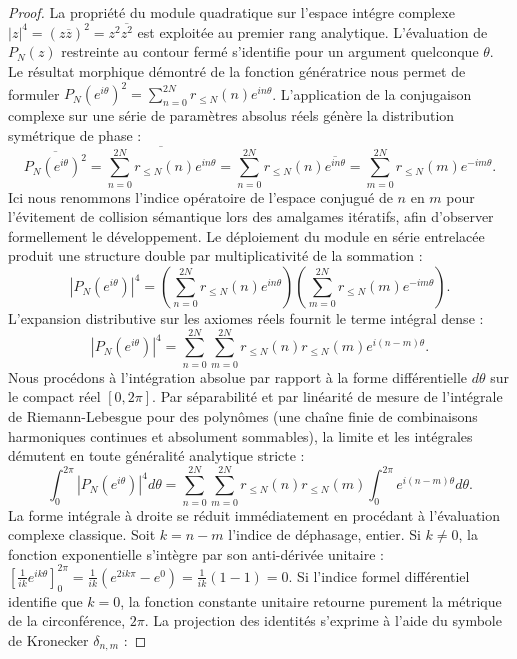 \documentclass[12pt,a4paper]{article}
\begin{document}
\begin{proof}
La propri\'et\'e du module quadratique sur l'espace int\'egre complexe $|z|^4 = (z \overline{z})^2 = z^2 \overline{z^2}$ est exploit\'ee au premier rang analytique. L'\'evaluation de $P_N(z)$ restreinte au contour ferm\'e s'identifie pour un argument quelconque $\theta$. Le r\'esultat morphique d\'emontr\'e de la fonction g\'en\'eratrice nous permet de formuler $P_N(e^{i\theta})^2 = \sum_{n=0}^{2N} r_{\le N}(n) e^{in\theta}$.
L'application de la conjugaison complexe sur une s\'erie de param\`etres absolus r\'eels g\'en\`ere la distribution sym\'etrique de phase :
\begin{equation}
\overline{P_N(e^{i\theta})^2} = \overline{ \sum_{n=0}^{2N} r_{\le N}(n) e^{in\theta} } = \sum_{n=0}^{2N} r_{\le N}(n) \overline{e^{in\theta}} = \sum_{m=0}^{2N} r_{\le N}(m) e^{-im\theta}.
\end{equation}
Ici nous renommons l'indice op\'eratoire de l'espace conjugu\'e de $n$ en $m$ pour l'\'evitement de collision s\'emantique lors des amalgames it\'eratifs, afin d'observer formellement le d\'eveloppement.
Le d\'eploiement du module en s\'erie entrelac\'ee produit une structure double par multiplicativit\'e de la sommation :
\begin{equation}
|P_N(e^{i\theta})|^4 = \left( \sum_{n=0}^{2N} r_{\le N}(n) e^{in\theta} \right) \left( \sum_{m=0}^{2N} r_{\le N}(m) e^{-im\theta} \right).
\end{equation}
L'expansion distributive sur les axiomes r\'eels fournit le terme int\'egral dense :
\begin{equation}
|P_N(e^{i\theta})|^4 = \sum_{n=0}^{2N} \sum_{m=0}^{2N} r_{\le N}(n) r_{\le N}(m) e^{i(n-m)\theta}.
\end{equation}
Nous proc\'edons \`a l'int\'egration absolue par rapport \`a la forme diff\'erentielle $d\theta$ sur le compact r\'eel $[0, 2\pi]$. Par s\'eparabilit\'e et par lin\'earit\'e de mesure de l'int\'egrale de Riemann-Lebesgue pour des polyn\^omes (une cha\^ine finie de combinaisons harmoniques continues et absolument sommables), la limite et les int\'egrales d\'emutent en toute g\'en\'eralit\'e analytique stricte :
\begin{equation}
\int_0^{2\pi} |P_N(e^{i\theta})|^4 d\theta = \sum_{n=0}^{2N} \sum_{m=0}^{2N} r_{\le N}(n) r_{\le N}(m) \int_0^{2\pi} e^{i(n-m)\theta} d\theta.
\end{equation}
La forme int\'egrale \`a droite se r\'eduit imm\'ediatement en proc\'edant \`a l'\'evaluation complexe classique. Soit $k = n - m$ l'indice de d\'ephasage, entier. Si $k \neq 0$, la fonction exponentielle s'int\`egre par son anti-d\'eriv\'ee unitaire : $\left[ \frac{1}{ik} e^{ik\theta} \right]_0^{2\pi} = \frac{1}{ik} (e^{2ik\pi} - e^0) = \frac{1}{ik} (1 - 1) = 0$. Si l'indice formel diff\'erentiel identifie que $k = 0$, la fonction constante unitaire retourne purement la m\'etrique de la circonf\'erence, $2\pi$. La projection des identit\'es s'exprime \`a l'aide du symbole de Kronecker $\delta_{n,m}$ :

\end{proof}
\end{document}
